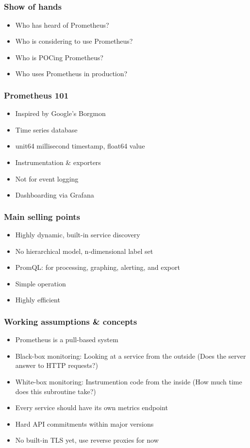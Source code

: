\documentclass[aspectratio=169]{beamer}
\begin{document}
\subsection{}




\begin{frame}
	\frametitle{Show of hands}
	\begin{itemize}
		\item Who has heard of Prometheus?
		\item Who is considering to use Prometheus?
		\item Who is POCing Prometheus?
		\item Who uses Prometheus in production?
	\end{itemize}
\end{frame}

\begin{frame}
	\frametitle{Prometheus 101}
	\begin{itemize}
		\item Inspired by Google's Borgmon
		\item Time series database
		\item unit64 millisecond timestamp, float64 value
		\item Instrumentation \& exporters
		\item Not for event logging
		\item Dashboarding via Grafana
	\end{itemize}
\end{frame}

\begin{frame}
	\frametitle{Main selling points}
	\begin{itemize}
		\item Highly dynamic, built-in service discovery
		\item No hierarchical model, n-dimensional label set
		\item PromQL: for processing, graphing, alerting, and export
		\item Simple operation
		\item Highly efficient
	\end{itemize}
\end{frame}

\begin{frame}
	\frametitle{Working assumptions \& concepts}
	\begin{itemize}
		\item Prometheus is a pull-based system
		\item Black-box monitoring: Looking at a service from the outside (Does the server answer to HTTP requests?)
		\item White-box monitoring: Instrumention code from the inside (How much time does this subroutine take?)
		\item Every service should have its own metrics endpoint
		\item Hard API commitments within major versions
		\item No built-in TLS yet, use reverse proxies for now
	\end{itemize}
\end{frame}
\end{document}
